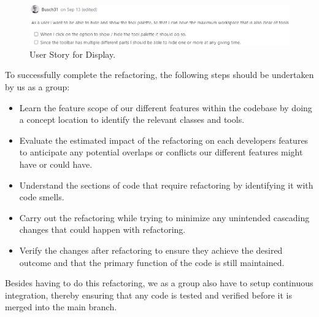 \begin{figure}[htbp]
    \centering
    \includegraphics[width=\linewidth]{pic/Tool_palette_Display.png}
    \caption{User Story for Display.}
    \label{fig:tool-palette-display}
\end{figure}

To successfully complete the refactoring, the following steps should be undertaken by us as a group:
\begin{itemize}
    \item Learn the feature scope of our different features within the codebase by doing a concept location to identify the relevant classes and tools.
    \item Evaluate the estimated impact of the refactoring on each developers features to anticipate any potential overlaps or conflicts our different features might have or could have.
    \item Understand the sections of code that require refactoring by identifying it with code smells.
    \item Carry out the refactoring while trying to minimize any unintended cascading changes that could happen with refactoring.
    \item Verify the changes after refactoring to ensure they achieve the desired outcome and that the primary function of the code is still maintained.
\end{itemize}

Besides having to do this refactoring, we as a group also have to setup continuous integration,
thereby ensuring that any code is tested and verified before it is merged into the main branch.
